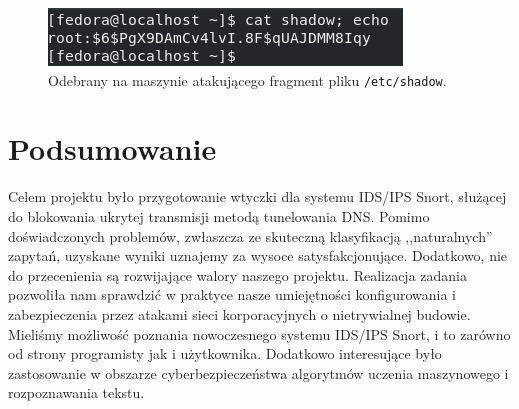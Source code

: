 \documentclass{eiti-raport}
\begin{document}
\begin{figure}[!h] \centering
	\includegraphics[width=0.65\linewidth]{img/dnsdec.PNG}
	\caption{Odebrany na maszynie atakującego fragment pliku \texttt{/etc/shadow}.} \label{fig:dnsdec}
\end{figure}

\section{Podsumowanie} \label{sec:summary}
Celem projektu było przygotowanie wtyczki dla systemu IDS/IPS Snort, służącej do blokowania ukrytej transmisji metodą tunelowania DNS. Pomimo doświadczonych problemów, zwłaszcza ze skuteczną klasyfikacją ,,naturalnych'' zapytań, uzyskane wyniki uznajemy za wysoce satysfakcjonujące. Dodatkowo, nie do przecenienia są rozwijające walory naszego projektu. Realizacja zadania pozwoliła nam sprawdzić w praktyce nasze umiejętności konfigurowania i zabezpieczenia przez atakami sieci korporacyjnych o nietrywialnej budowie. Mieliśmy możliwość poznania nowoczesnego systemu IDS/IPS Snort, i to zarówno od strony programisty jak i użytkownika. Dodatkowo interesujące było zastosowanie w obszarze cyberbezpieczeństwa algorytmów uczenia maszynowego i rozpoznawania tekstu. 

\printbibliography
\end{document}
